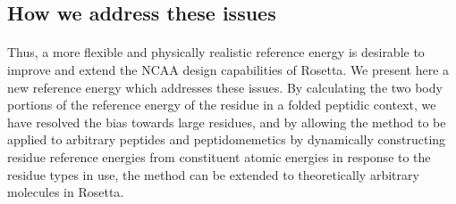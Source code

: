 \subsection{How we address these issues}
\paragraph{}
Thus, a more flexible and physically realistic reference energy is desirable to improve and extend the NCAA design capabilities of Rosetta.
We present here a new reference energy which addresses these issues.
By calculating the two body portions of the reference energy of the residue in a folded peptidic context, we have resolved the bias towards large residues, and by allowing the method to be applied to arbitrary peptides and peptidomemetics by dynamically constructing residue reference energies from constituent atomic energies in response to the residue types in use, the method can be extended to theoretically arbitrary molecules in Rosetta.


